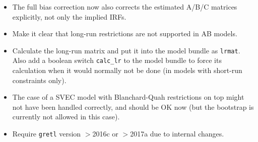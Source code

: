 \documentclass[a4paper,10pt]{article}
\begin{document}
\begin{itemize}

\item The full bias correction now also corrects the estimated A/B/C matrices
explicitly, not only the implied IRFs.

\item Make it clear that long-run restrictions are not supported in AB models.

\item Calculate the long-run matrix and put it into the model bundle as \texttt{lrmat}.
Also add a boolean switch \texttt{calc\_lr} to the model bundle to force its 
calculation when it would normally not be done 
(in models with short-run constraints only).

\item The case of a SVEC model with Blanchard-Quah restrictions on top might 
not have been handled correctly, and should be OK now (but the bootstrap is 
currently not allowed in this case).

\item Require \texttt{gretl} version $>$2016c or $>$2017a due to internal changes.

\end{itemize}
\end{document}
